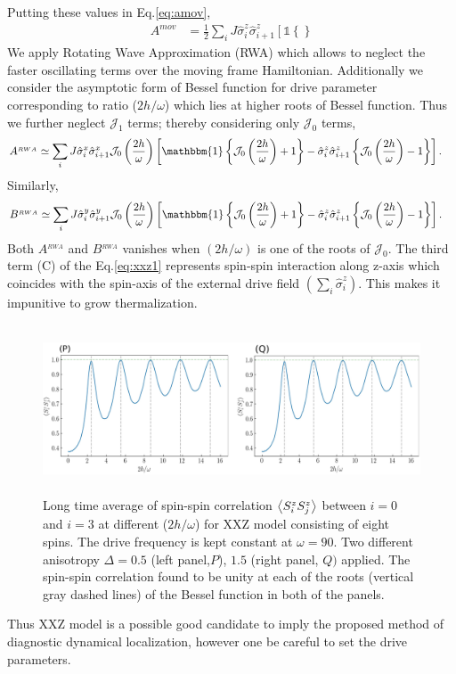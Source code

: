 \documentclass[aps,prb,reprint,showpacs,floatfix,superscriptaddress, onecolumn, nofootinbib, 9pt]{revtex4-2}
\begin{document}
\begin{enumerate}
{	Putting these values in Eq.\eqref{eq:amov},
	\begin{align}
	A^{mov} &= \frac12\sum_i J \hat{\sigma}^z_i \hat{\sigma}^z_{i+1}\left[ \mathbb{1}\left\{\right\}
	\end{align}
	We apply Rotating Wave Approximation (RWA) which allows to neglect the faster oscillating terms over the moving frame Hamiltonian. Additionally we consider the asymptotic form of Bessel function for drive parameter corresponding to ratio ($2h/\omega$) which lies at higher roots of Bessel function. Thus we further neglect $\mathcal{J}_1$ terms; thereby considering only $\mathcal{J}_0$ terms,
	\begin{align}
	A^{_{RWA}} &\simeq \sum_{i} J \hat{\sigma}_{i}^{x} \hat{\sigma}_{i+1}^{x}\mathcal{J}_0\left(\frac{2h}{\omega}\right) \left[\mathbbm{1}\left\{\mathcal{J}_0\left(\frac{2h}{\omega}\right)+1\right\}-\hat{\sigma}^z_i\hat{\sigma}^z_{i+1}\left\{\mathcal{J}_0\left(\frac{2h}{\omega}\right)-1\right\}\right].
	\label{eq:xxz_a}
	\end{align}
	Similarly, 
	\begin{align}
		B^{_{RWA}} &\simeq \sum_{i} J \hat{\sigma}_{i}^{y} \hat{\sigma}_{i+1}^{y}\mathcal{J}_0\left(\frac{2h}{\omega}\right) \left[\mathbbm{1}\left\{\mathcal{J}_0\left(\frac{2h}{\omega}\right)+1\right\}-\hat{\sigma}^z_i\hat{\sigma}^z_{i+1}\left\{\mathcal{J}_0\left(\frac{2h}{\omega}\right)-1\right\}\right].
		\label{eq:xxz_b}
	\end{align}
	Both $A^{_{RWA}}$ and $B^{_{RWA}}$ vanishes when $(2h/\omega)$ is one of the roots of $\mathcal{J}_0$. The third term (C) of the Eq.\eqref{eq:xxz1} represents spin-spin interaction along z-axis which coincides with the spin-axis of the external drive field $(\sum_i\hat{\sigma}^z_i)$. This makes it impunitive to grow thermalization. 
	\begin{figure}[h!]
		\includegraphics[height=5cm]{xxz_d.png}
		\caption{Long time average of spin-spin correlation $\expval{S^z_i S^z_{j}}$ between $i=0$ and $i=3$ at different ($2h/\omega$) for XXZ model consisting of eight spins. The drive frequency is kept constant at $\omega = 90$. Two different anisotropy $\Delta = 0.5$ (left panel,$P$), $1.5$ (right panel, $Q)$ applied. The spin-spin correlation found to be unity at each of the roots (vertical gray dashed lines) of the Bessel function in both of the panels.}
		\label{fig:std_Ns}
	\end{figure}

	Thus XXZ model is a possible good candidate to imply the proposed method of diagnostic dynamical localization, however one be careful to set the drive parameters.
	}
	\end{enumerate}
\end{document}
